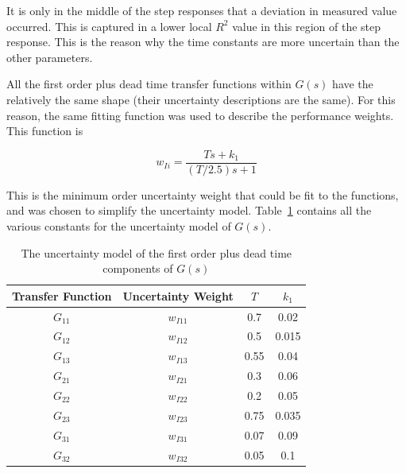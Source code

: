 It is only in the middle of the step responses that a deviation in measured value occurred. This is captured in a lower local $R^2$ value in this region of the step response. This is the reason why the time constants are more uncertain than the other parameters.

All the first order plus dead time transfer functions within $G(s)$ have the relatively the same shape (their uncertainty descriptions are the same). For this reason, the same fitting function was used to describe the performance weights. This function is

\begin{equation}
	\label{eq:Uncertainty weights}
	w_{Ii} = \frac{Ts + k_1}{(T/2.5)s + 1}
\end{equation}

This is the minimum order uncertainty weight that could be fit to the functions, and was chosen to simplify the uncertainty model. Table~\ref{tab:Uncertainty description G(s)} contains all the various constants for the uncertainty model of $G(s)$.

\begin{table}[H]
	\centering
	\begin{tabular}{cccc}
		\hline
		\textbf{Transfer Function} & \textbf{Uncertainty Weight} & \textbf{$T$} & \textbf{$k_1$} \\
		\hline
		$G_{11}$                        & $w_{I11}$                  & 0.7        & 0.02        \\
		$G_{12}$                        & $w_{I12}$                  & 0.5        & 0.015       \\
		$G_{13}$                        & $w_{I13}$                  & 0.55       & 0.04        \\
		$G_{21}$                        & $w_{I21}$                  & 0.3        & 0.06        \\
		$G_{22}$                        & $w_{I22}$                  & 0.2        & 0.05        \\
		$G_{23}$                        & $w_{I23}$                  & 0.75       & 0.035       \\
		$G_{31}$                        & $w_{I31}$                  & 0.07       & 0.09        \\
		$G_{32}$                        & $w_{I32}$                  & 0.05       & 0.1       \\\hline 
	\end{tabular}
	\caption{The uncertainty model of the first order plus dead time components of $G(s)$}
	\label{tab:Uncertainty description G(s)}
\end{table}

